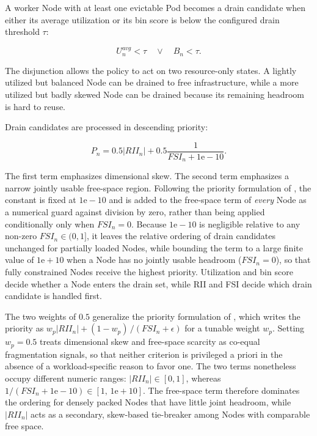 A worker Node with at least one evictable Pod becomes a drain candidate when either its average utilization or its bin score is below the configured drain threshold \(\tau\):

\[
    U_n^{avg} < \tau
    \quad \lor \quad
    B_n < \tau.
\]

The disjunction allows the policy to act on two resource-only states. A lightly utilized but balanced Node can be drained to free infrastructure, while a more utilized but badly skewed Node can be drained because its remaining headroom is hard to reuse.

Drain candidates are processed in descending priority:

\[
    P_n =
    0.5\left|RII_n\right|
    +
    0.5\frac{1}{FSI_n+1\mathrm{e}{-}10}.
\]

The first term emphasizes dimensional skew. The second term emphasizes a narrow jointly usable free-space region. Following the priority formulation of \cite{guo2025joint}, the constant is fixed at \(1\mathrm{e}{-}10\) and is added to the free-space term of \emph{every} Node as a numerical guard against division by zero, rather than being applied conditionally only when \(FSI_n = 0\). Because \(1\mathrm{e}{-}10\) is negligible relative to any non-zero \(FSI_n \in (0,1]\), it leaves the relative ordering of drain candidates unchanged for partially loaded Nodes, while bounding the term to a large finite value of \(1\mathrm{e}{+}10\) when a Node has no jointly usable headroom (\(FSI_n = 0\)), so that fully constrained Nodes receive the highest priority. Utilization and bin score decide whether a Node enters the drain set, while RII and FSI decide which drain candidate is handled first.

The two weights of \(0.5\) generalize the priority formulation of \cite{guo2025joint}, which writes the priority as \(w_p\left|RII_n\right| + (1-w_p)\,/(FSI_n+\epsilon)\) for a tunable weight \(w_p\). Setting \(w_p = 0.5\) treats dimensional skew and free-space scarcity as co-equal fragmentation signals, so that neither criterion is privileged a priori in the absence of a workload-specific reason to favor one. The two terms nonetheless occupy different numeric ranges: \(\left|RII_n\right| \in [0,1]\), whereas \(1/(FSI_n+1\mathrm{e}{-}10) \in [1,\,1\mathrm{e}{+}10]\). The free-space term therefore dominates the ordering for densely packed Nodes that have little joint headroom, while \(\left|RII_n\right|\) acts as a secondary, skew-based tie-breaker among Nodes with comparable free space.

